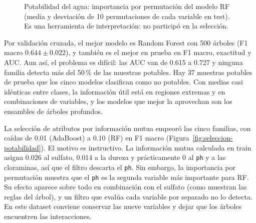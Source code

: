 \documentclass[11pt]{article}
\begin{document}
\begin{figure}[H]\centering
{}
\caption{Potabilidad del agua: importancia por permutación del modelo RF (media y desviación de 10 permutaciones de cada variable en test). Es una herramienta de interpretación: no participó en la selección.}
\label{fig:perm-potabilidad}
\end{figure}

Por validación cruzada, el mejor modelo es Random Forest con 500 árboles (F1 macro
$0.644\pm0.022$), y también es el mejor en prueba en F1 macro, exactitud y AUC. Aun
así, el problema es difícil: las AUC van de 0.615 a 0.727 y ninguna familia detecta
más del 50\,\% de las muestras potables. Hay 37 muestras potables de prueba que los
cinco modelos clasifican como no potables. Con medias casi idénticas entre clases, la
información útil está en regiones extremas y en combinaciones de variables, y los
modelos que mejor la aprovechan son los ensambles de árboles profundos.

La selección de atributos por información mutua empeoró las cinco familias, con caídas
de 0.01 (AdaBoost) a 0.10 (RF) en F1 macro (Figura~\ref{fig:seleccion-potabilidad}). El motivo es
instructivo. La información mutua calculada en train asigna 0.026 al sulfato, 0.014 a
la dureza y prácticamente 0 al \texttt{ph} y a las cloraminas, así que el filtro
descarta el \texttt{ph}. Sin embargo, la importancia por permutación muestra que el
\texttt{ph} es la segunda variable más importante para RF. Su efecto aparece sobre todo
en combinación con el sulfato (como muestran las reglas del árbol), y un filtro que
evalúa cada variable por separado no lo detecta. En este dataset conviene conservar
las nueve variables y dejar que los árboles encuentren las interacciones.
\end{document}
